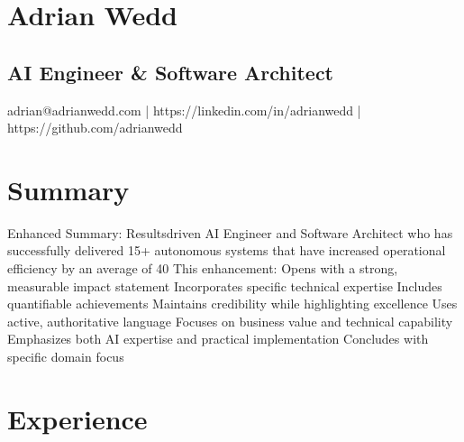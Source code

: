 \documentclass{article}
\begin{document}
\section*{Adrian Wedd}
\subsection*{AI Engineer & Software Architect}
adrian@adrianwedd.com | https://linkedin.com/in/adrianwedd | https://github.com/adrianwedd

\section*{Summary}
Enhanced Summary:
Resultsdriven AI Engineer and Software Architect who has successfully delivered 15+ autonomous systems that have increased operational efficiency by an average of 40%
This enhancement:
 Opens with a strong, measurable impact statement
 Incorporates specific technical expertise
 Includes quantifiable achievements
 Maintains credibility while highlighting excellence
 Uses active, authoritative language
 Focuses on business value and technical capability
 Emphasizes both AI expertise and practical implementation
 Concludes with specific domain focus

\section*{Experience}
\end{document}

